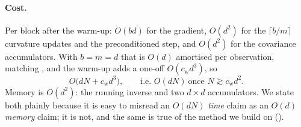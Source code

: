 \paragraph{Cost.} Per block after the warm-up: $O(bd)$ for the gradient, $O(d^2)$ for the
$\lceil b/m\rceil$ curvature updates and the preconditioned step, and $O(d^2)$ for the covariance
accumulators. With $b=m=d$ that is $O(d)$ amortised per observation, matching
\citet{godichonbaggioni2025adaptive}, and the warm-up adds a one-off $O(c_{\mathrm w}d^3)$, so
\begin{equation}
O\big(dN+c_{\mathrm w}d^3\big),
\qquad\text{i.e.\ } O(dN)\ \text{once } N\gtrsim c_{\mathrm w}d^2 .
\label{eq:cost}
\end{equation}
Memory is $O(d^2)$: the running inverse and two $d\times d$ accumulators. We state both plainly
because it is easy to misread an $O(dN)$ \emph{time} claim as an $O(d)$ \emph{memory} claim; it is
not, and the same is true of the method we build on ().
